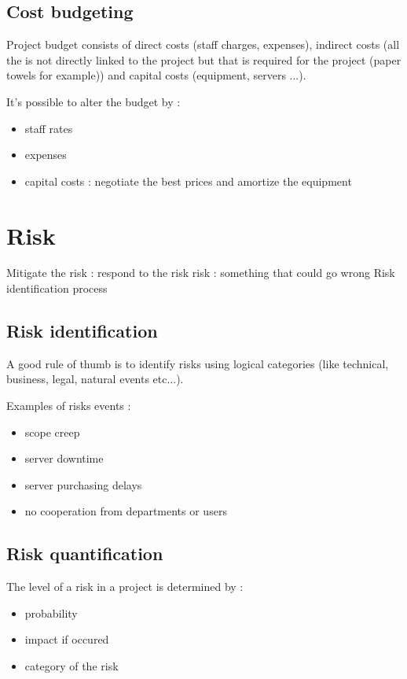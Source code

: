 \documentclass{article}
\begin{document}
\subsection{Cost budgeting}
Project budget consists of direct costs (staff charges, expenses), indirect costs (all the is not directly linked to the project but that is required for the project (paper towels for example)) and capital costs (equipment, servers ...).\newline
\newline

It's possible to alter the budget by :
\begin{itemize}
	\item staff rates
	\item expenses
	\item capital costs : negotiate the best prices and amortize the equipment
\end{itemize}

\section{Risk}
Mitigate the risk : respond to the risk\newline
\noindent risk : something that could go wrong
\newline
\noindent Risk identification process
\subsection{Risk identification}
A good rule of thumb is to identify risks using logical categories (like technical, business, legal, natural events etc...).\newline

Examples of risks events :
\begin{itemize}
	\item scope creep
	\item server downtime
	\item server purchasing delays
	\item no cooperation from departments or users
\end{itemize}



\subsection{Risk quantification}
The level of a risk in a project is determined by :
\begin{itemize}
	\item probability
	\item impact if occured
	\item category of the risk
\end{itemize}
\end{document}
